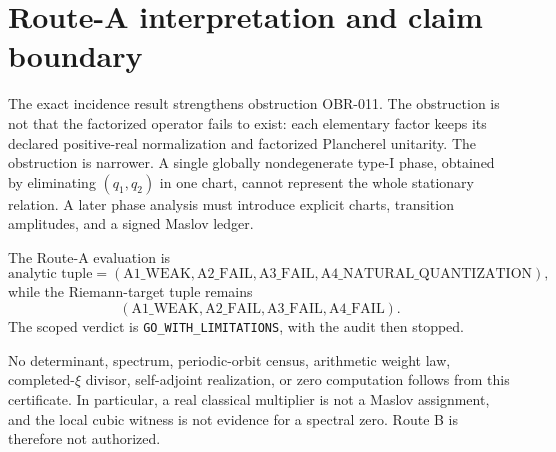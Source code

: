 \section{Route-A interpretation and claim boundary}

The exact incidence result strengthens obstruction OBR-011.  The obstruction is
not that the factorized operator fails to exist: each elementary factor keeps
its declared positive-real normalization and factorized Plancherel unitarity.
The obstruction is narrower.  A single globally nondegenerate type-I phase,
obtained by eliminating \((q_1,q_2)\) in one chart, cannot represent the whole
stationary relation.  A later phase analysis must introduce explicit charts,
transition amplitudes, and a signed Maslov ledger.

The Route-A evaluation is
\[
\text{analytic tuple}=(\mathrm{A1\_WEAK},\mathrm{A2\_FAIL},
\mathrm{A3\_FAIL},\mathrm{A4\_NATURAL\_QUANTIZATION}),
\]
while the Riemann-target tuple remains
\[
 (\mathrm{A1\_WEAK},\mathrm{A2\_FAIL},\mathrm{A3\_FAIL},\mathrm{A4\_FAIL}).
\]
The scoped verdict is \texttt{GO\_WITH\_LIMITATIONS}, with the audit then stopped.

No determinant, spectrum, periodic-orbit census, arithmetic weight law,
completed-\(\xi\) divisor, self-adjoint realization, or zero computation follows
from this certificate.  In particular, a real classical multiplier is not a
Maslov assignment, and the local cubic witness is not evidence for a spectral
zero.  Route B is therefore not authorized.
